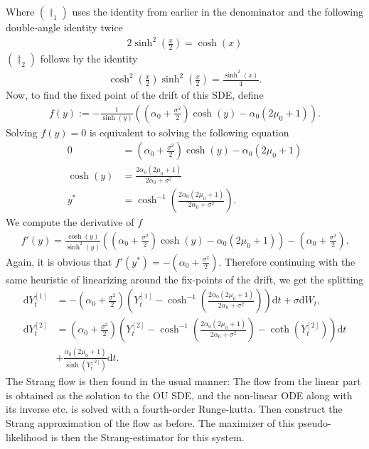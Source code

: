 Where $(\dagger_1)$ uses the identity from earlier in the denominator and the following double-angle identity twice
\begin{align*}
    2\sinh^2\left(\frac{x}{2}\right) = \cosh(x)
\end{align*}
$(\dagger_2)$ follows by the identity
\begin{align*}
    \cosh^2\left(\frac{x}{2}\right)\sinh^2\left(\frac{x}{2}\right) = \frac{\sinh^2(x)}{4}.
\end{align*}
Now, to find the fixed point of the drift of this SDE, define 
\begin{align}
    f(y) :=  -\frac{1}{\sinh(y)}\left(\left(\alpha_0 + \frac{\sigma^2}{2}\right)\cosh(y) - \alpha_0\left(2\mu_0 + 1\right)\right).
\end{align}
Solving $f(y) = 0$ is equivalent to solving the following equation
\begin{align}
    0 &= \left(\alpha_0 + \frac{\sigma^2}{2}\right)\cosh(y) - \alpha_0\left(2\mu_0 + 1\right) \nonumber \\
    \cosh(y) &= \frac{2\alpha_0\left(2\mu_0 + 1\right)}{2\alpha_0 + \sigma^2} \nonumber\\
    y^* &= \cosh^{-1}\left(\frac{2\alpha_0\left(2\mu_0 + 1\right)}{2\alpha_0 + \sigma^2}\right).
\end{align}
We compute the derivative of $f$
\begin{align}
    f'(y) = \frac{\cosh(y)}{\sinh^2(y)}\left(\left(\alpha_0 + \frac{\sigma^2}{2}\right)\cosh(y) - \alpha_0\left(2\mu_0 + 1\right)\right) - \left(\alpha_0 + \frac{\sigma^2}{2}\right).
\end{align}
Again, it is obvious that $f'(y^*) = - \left(\alpha_0 + \frac{\sigma^2}{2}\right)$.
Therefore continuing with the same heuristic of linearizing around the fix-points of the drift, we get the splitting
\begin{align}
    \mathrm{d}Y_t^{[1]} &= -\left(\alpha_0 + \frac{\sigma^2}{2}\right)\left(Y_t^{[1]} - \cosh^{-1}\left(\frac{2\alpha_0\left(2\mu_0 + 1\right)}{2\alpha_0 + \sigma^2}\right)\right)\mathrm{d}t + \sigma \mathrm{d}W_t, \\
    \mathrm{d}Y_t^{[2]} &= \left(\alpha_0 + \frac{\sigma^2}{2}\right) \left(Y_t^{[2]} - \cosh^{-1}\left(\frac{2\alpha_0\left(2\mu_0 + 1\right)}{2\alpha_0 + \sigma^2}\right) - \coth\left(Y_t^{[2]}\right) \right)\mathrm{d}t\nonumber\\
    &+ \frac{\alpha_0\left(2\mu_0 + 1\right)}{\sinh(Y_t^{[2]})}\mathrm{d}t. \label{eq:scaledFStrang}
\end{align}
The Strang flow is then found in the usual manner: The flow from the linear part is obtained as the solution to the OU SDE, and the non-linear ODE along with its inverse etc. is solved with a fourth-order Runge-kutta. Then construct the Strang approximation of the flow as before. The maximizer of this pseudo-likelihood is then the Strang-estimator for this system.  
